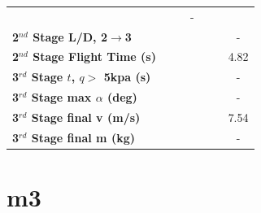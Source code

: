 \begin{table}[ht]
\begin{tabular}{l c c c c c c}
	& \secondthirdSeparationqmFuelOneHundredFive
	& \secondthirdSeparationqmFuelOneHundredTen
	& -
	\\
	\textbf{2$^{nd}$ Stage L/D, 2$\rightarrow$3}
	& \secondthirdSeparationLDmFuelNinety
	& \secondthirdSeparationLDmFuelNinetyFive
	& \secondthirdSeparationLDmFuelStandard
	& \secondthirdSeparationLDmFuelOneHundredFive
	& \secondthirdSeparationLDmFuelOneHundredTen
	& -
	\\
	\textbf{2$^{nd}$ Stage Flight Time (s)}
	& \secondFlightTimemFuelNinety
	& \secondFlightTimemFuelNinetyFive
	& \secondFlightTimemFuelStandard
	& \secondFlightTimemFuelOneHundredFive
	& \secondFlightTimemFuelOneHundredTen
	&4.82
	\\
	\textbf{3$^{rd}$ Stage $t$, $q >$ 5kpa (s)}
	& \thirdqOverFivemFuelNinety
	& \thirdqOverFivemFuelNinetyFive
	& \thirdqOverFivemFuelStandard
	& \thirdqOverFivemFuelOneHundredFive
	& \thirdqOverFivemFuelOneHundredTen
	& -
	\\
	\textbf{3$^{rd}$ Stage max $\alpha$ (deg)}
	& \thirdmaxAoAmFuelNinety
	& \thirdmaxAoAmFuelNinetyFive
	& \thirdmaxAoAmFuelStandard
	& \thirdmaxAoAmFuelOneHundredFive
	& \thirdmaxAoAmFuelOneHundredTen
	& -
	\\
	\textbf{3$^{rd}$ Stage final v (m/s)}
	& \thirdcircvmFuelNinety
	& \thirdcircvmFuelNinetyFive
	& \thirdcircvmFuelStandard
	& \thirdcircvmFuelOneHundredFive
	& \thirdcircvmFuelOneHundredTen
	&7.54
	\\
	\textbf{3$^{rd}$ Stage final m (kg)}
	& \thirdcircmmFuelNinety
	& \thirdcircmmFuelNinetyFive
	& \thirdcircmmFuelStandard
	& \thirdcircmmFuelOneHundredFive
	& \thirdcircmmFuelOneHundredTen
	& -
	\\
	\hline 
\end{tabular} 
\end{table}
	

\section{m3}

